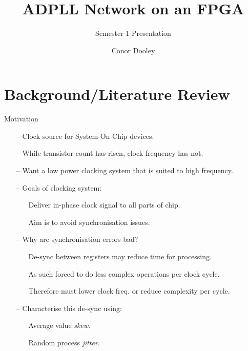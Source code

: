 \documentclass{beamer}
\title{ADPLL Network on an FPGA}
\author{Conor Dooley}
\subtitle{Semester 1 Presentation}
\begin{document}
\begin{frame}
    \titlepage
\end{frame}

\section*{Background/Literature Review}
\begin{frame}{Motivation}

    \begin{itemize}
        \item[--]
            Clock source for System-On-Chip devices.
        \item[--]
        	While transistor count has risen, clock frequency has not.
        \item[--]
        	Want a low power clocking system that is suited to high frequency.
        \item[--]
            Goals of clocking system:
            \begin{itemize}
            	\item[]
            		Deliver in-phase clock signal to all parts of chip.
		        \item[]
		            Aim is to avoid synchronisation issues.
		    \end{itemize}
        \item[--]
            Why are synchronisation errors bad?
        \begin{itemize}
        	\item[]
        		De-sync between registers may reduce time for processing.
            \item[]
                As such forced to do less complex operations per clock cycle.
            \item[]
                Therefore must lower clock freq. or reduce complexity per cycle.
        \end{itemize}
    	\item[--]
    		Characterise this de-sync using:
    		\begin{itemize}
    			\item[]
    				Average value \textit{skew}.
    			\item[]
	    			Random process \textit{jitter}.
    		\end{itemize}
    \end{itemize}
\end{frame}
\end{document}
